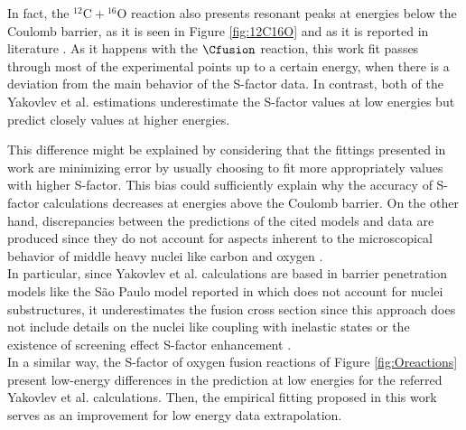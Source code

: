 \documentclass[openany]{book}
\begin{document}
In fact, the $\mathrm{{}^{12}C + {}^{16}O}$ reaction also presents resonant peaks at energies below the Coulomb barrier, as it is seen in Figure \ref{fig:12C16O} and as it is reported in literature \cite{torilov_maltsev_zherebchevsky_2021}. As it happens with the $\Cfusion$ reaction, this work fit passes through most of the experimental points up to a certain energy, when there is a deviation from the main behavior of the S-factor data. In contrast, both of the Yakovlev et al. estimations underestimate the S-factor values at low energies but predict closely values at higher energies. \\


This difference might be explained by considering that the fittings presented in work are minimizing error by usually choosing to fit more appropriately values with higher S-factor. This bias could sufficiently explain why the accuracy of S-factor calculations decreases at energies above the Coulomb barrier. On the other hand, discrepancies between the predictions of the cited models and data are produced since they do not account for aspects inherent to the microscopical behavior of middle heavy nuclei like carbon and oxygen  \cite{duarte_gasques_oliveira_zagatto_chamon_medina_added_seale_alcantara-nunez_rossi_et_2015}. \\

In particular,  since Yakovlev et al. calculations are based in barrier penetration models like the São Paulo model reported in \cite{yakovlev_beard_gasques_wiescher_2010} which does not account for nuclei substructures, it underestimates the fusion cross section since this approach does not include details on the nuclei like coupling with inelastic states or the existence of screening effect S-factor enhancement \cite{koyuncu_soylu_2018}. \\

In a similar way, the S-factor of oxygen fusion reactions of Figure \ref{fig:Oreactions} present low-energy differences in the prediction at low energies for the referred Yakovlev et al. calculations. Then, the empirical fitting proposed in this work serves as an improvement for low energy data extrapolation. \\
\end{document}
